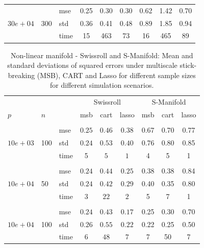 \begin{table}[t]
\begin{center}
\begin{small}
\begin{sc}
\begin{tabular}{lllcccccc}
\\
\multirow{3}{*}{$30e+04$}&\multirow{3}{*}{300}&mse&0.25&0.30&0.30&0.62&1.42&0.70\\
&&std &0.36&0.41&0.48&0.89&1.85&0.94\\
&&time &15&463&73&16&465&89\\

\hline
\end{tabular}
\end{sc}
\end{small}
\end{center}
\vskip -0.1in
\end{table}



\begin{table}[t]
\caption{Non-linear manifold - Swissroll and S-Manifold: Mean and standard deviations of squared errors under multiscale stick-breaking (MSB), CART and Lasso for different sample sizes for different simulation scenarios.}\label{table:swiss}
\vskip 0.15in
\begin{center}
\begin{small}
\begin{sc}
\begin{tabular}{lllcccccc}
\hline
&&&\multicolumn{3}{c}{Swissroll}&\multicolumn{3}{c}{S-Manifold}\\

$p$&$n$& & msb&cart& lasso & msb&cart& lasso\\
\\
\multirow{3}{*}{$10e+03$}&\multirow{3}{*}{100}&mse &$0.25$&$0.46$&$0.38$&0.67&0.70&0.77\\
&&std & $0.24$ & $0.53$&$0.40$&0.76&0.80&0.85\\
&&time & 5& $5$&$1$&4 & 5 & 1 \\

\\
\multirow{3}{*}{$10e+04$}&\multirow{3}{*}{50}&mse &$0.24$&$0.44$&$0.25$&0.38&0.38&0.84\\
&&std & $0.24$ & $0.42$&$0.29$&0.40&0.35&0.80\\
&&time & 3 & $22$&$2$ &5&7&1\\

\\
\multirow{3}{*}{$10e+04$}&\multirow{3}{*}{100}&mse &$0.24$ & $0.43$&$0.17$&0.25&0.30&0.70\\
&&std & $0.26$&$0.55$&$0.22$&0.22 & 0.25 &0.50\\
&&time&$6$&$48$&$7$&7 & 50 & 7\\


\end{tabular}
\end{sc}
\end{small}
\end{center}
\end{table}
